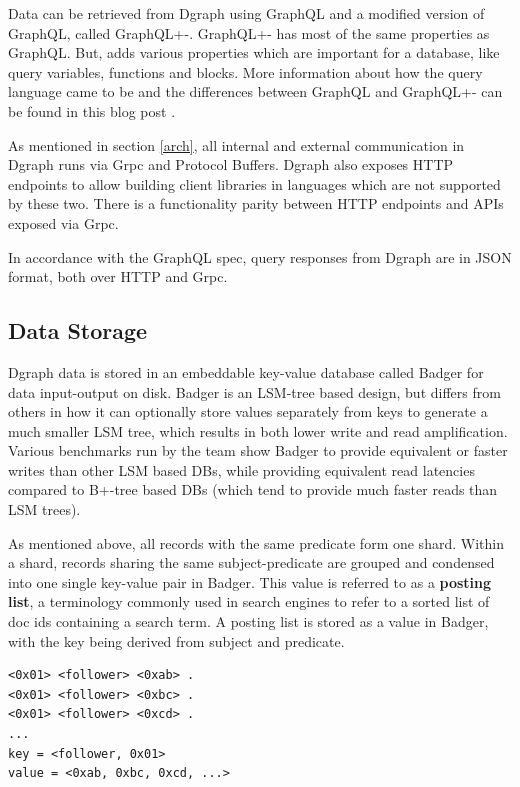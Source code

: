 \documentclass[letterpaper,twocolumn,10pt]{article}
\begin{document}
Data can be retrieved from Dgraph using GraphQL\cite{gql} and a modified version of
GraphQL, called GraphQL+-\cite{dgql}. GraphQL+- has most of the same
properties as GraphQL. But, adds various properties which are important for a
database, like query variables, functions and blocks. More information about how
the query language came to be and the differences between GraphQL and GraphQL+-
can be found in this blog post \cite{gqldb}.

As mentioned in section \ref{arch}, all internal and external communication in
Dgraph runs via Grpc and Protocol Buffers. Dgraph also exposes HTTP endpoints to
allow building client libraries in languages which are not supported by these
two.  There is a functionality parity between HTTP endpoints and APIs exposed
via Grpc.

In accordance with the GraphQL spec, query responses from Dgraph are in JSON
format, both over HTTP and Grpc.

\subsection{Data Storage} \label{storage}

Dgraph data is stored in an embeddable key-value database called
Badger\cite{badger} for data input-output on disk. Badger is an LSM-tree based
design, but differs from others in how it can optionally store values separately
from keys to generate a much smaller LSM tree, which results in both lower write
and read amplification. Various benchmarks run by the team show Badger to
provide equivalent or faster writes than other LSM based DBs, while providing
equivalent read latencies compared to B+-tree based DBs (which tend to provide
much faster reads than LSM trees).

As mentioned above, all records with the same predicate form one shard. Within a
shard, records sharing the same subject-predicate are grouped and condensed into
one single key-value pair in Badger. This value is referred to as a
\textbf{posting list}, a terminology commonly used in search engines to refer to
a sorted list of doc ids containing a search term. A posting list is stored as a
value in Badger, with the key being derived from subject and predicate.

\begin{verbatim}
<0x01> <follower> <0xab> .
<0x01> <follower> <0xbc> .
<0x01> <follower> <0xcd> .
...
key = <follower, 0x01>
value = <0xab, 0xbc, 0xcd, ...>
\end{verbatim}
\end{document}
